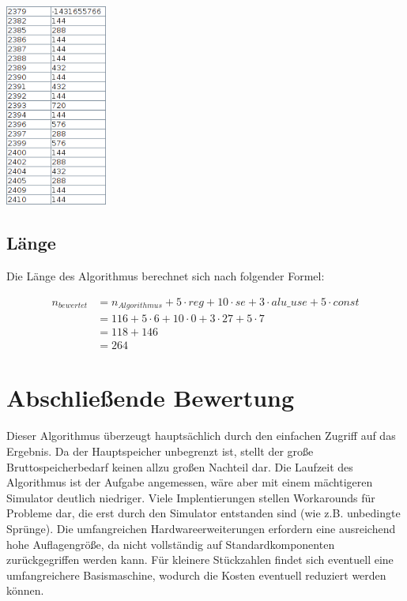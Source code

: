 \begin{multicols}{3}
    \includegraphics[width=0.25\textwidth]{dokumentation/res/bench3_result.png}
\end{multicols}

\subsection{Länge}
\label{subsection:Dokumentation-BenchmarkBewertung-Berechnung-Laenge}

Die Länge des Algorithmus berechnet sich nach folgender Formel:

\begin{align*}
    n_{bewertet} &= n_{Algorithmus} + 5 \cdot reg + 10 \cdot se + 3 \cdot alu\_use + 5 \cdot const \\
                 &= 116 + 5 \cdot 6 + 10 \cdot 0 + 3 \cdot 27 + 5 \cdot 7 \\
                 &= 118 + 146 \\
                 &= 264
\end{align*}

\section{Abschließende Bewertung}
\label{section:Dokumentation-BenchmarkBewertung-Bewertung}

Dieser Algorithmus überzeugt hauptsächlich durch den einfachen Zugriff auf das Ergebnis. Da der Hauptspeicher unbegrenzt ist, stellt der große Bruttospeicherbedarf keinen allzu großen Nachteil dar. Die Laufzeit des Algorithmus ist der Aufgabe angemessen, wäre aber mit einem mächtigeren Simulator deutlich niedriger. Viele Implentierungen stellen Workarounds für Probleme dar, die erst durch den Simulator entstanden sind (wie z.B. unbedingte Sprünge). Die umfangreichen Hardwareerweiterungen erfordern eine ausreichend hohe Auflagengröße, da nicht vollständig auf Standardkomponenten zurückgegriffen werden kann. Für kleinere Stückzahlen findet sich eventuell eine umfangreichere Basismaschine, wodurch die Kosten eventuell reduziert werden können.

